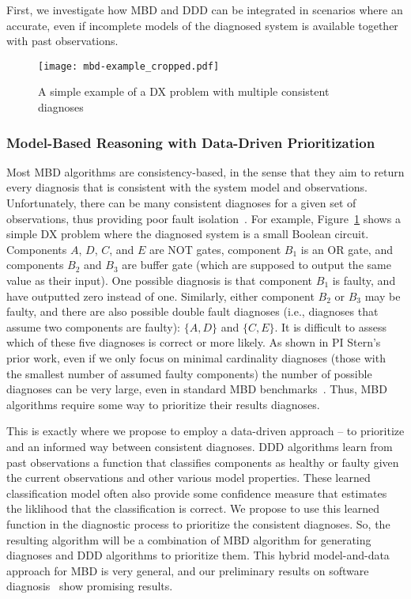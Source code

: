 \documentclass[12pt]{article}
\begin{document}
First, we investigate how MBD and DDD can be integrated in scenarios where an accurate, even if incomplete models of the diagnosed system is available together with past observations. 


\begin{figure}
    \centering
	\texttt{[image: mbd-example\_cropped.pdf]}
    \caption{A simple example of a DX problem with multiple consistent diagnoses}
    \label{fig:mbd-example}
\end{figure}

\subsubsection{Model-Based Reasoning with Data-Driven Prioritization} 
Most MBD algorithms are consistency-based, in the sense that they aim to return every diagnosis  that is consistent with the system model and observations. 
Unfortunately, there can be many consistent diagnoses for a given set of observations, thus providing poor fault isolation~\cite{stern2015many}. 
For example, Figure~\ref{fig:mbd-example} shows a simple DX problem where the diagnosed system is a small Boolean circuit. Components $A$, $D$, $C$, and $E$ are NOT gates, component $B_1$ is an OR gate, and components $B_2$ and $B_3$ are buffer gate (which are supposed to output the same value as their input). One possible diagnosis is that component $B_1$ is faulty, and have outputted zero instead of one. Similarly, either component $B_2$ or $B_3$ may be faulty, 
and there are also possible double fault diagnoses (i.e., diagnoses that assume two components are faulty): $\{ A,D \}$ and $\{C,E\}$. It is difficult to assess which of these five diagnoses is correct or more likely. 
As shown in PI Stern's prior work, even if we only focus on minimal cardinality diagnoses (those with the smallest number of assumed faulty components) the number of possible diagnoses can be very large, even in standard MBD benchmarks~\cite{stern2015many}. Thus, MBD algorithms require some way to prioritize their results diagnoses. 


This is exactly where we propose to employ a data-driven approach -- to prioritize and an informed way between consistent diagnoses. 
DDD algorithms learn from past observations a function that classifies components as healthy or faulty given the current observations and other various model properties. These learned classification model often also provide some confidence measure that estimates the liklihood that the classification is correct. We propose to use this learned function in the diagnostic process to prioritize the consistent diagnoses. So, the resulting algorithm will be a combination of MBD algorithm for generating diagnoses and DDD algorithms to prioritize them. This hybrid model-and-data approach for MBD is very general, and our preliminary results on software diagnosis~\cite{elmishali2016dataAugmented} show promising results. 
\end{document}

